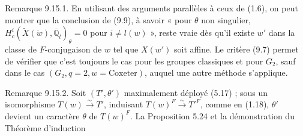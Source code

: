 \documentclass[9pt,twoside]{extarticle}
\begin{document}
{Remarque 9.15.1. En utilisant des arguments parallèles à ceux de (1.6), on peut montrer que la conclusion de (9.9), à savoir « pour \(\theta\) non singulier, \(H_c^i(\widetilde X(\dot w),\overline{\mathbb Q}_l)_\theta=0\) pour \(i\ne l(w)\) », reste vraie dès qu'il existe \(w'\) dans la classe de \(F\)-conjugaison de \(w\) tel que \(X(w')\) soit affine. Le critère (9.7) permet de vérifier que c'est toujours le cas pour les groupes classiques et pour \(G_2\), sauf dans le cas \((G_2,q=2,w=\text{Coxeter})\), auquel une autre méthode s'applique.\par

Remarque 9.15.2. Soit \((T',\theta')\) maximalement déployé (5.17) ; sous un isomorphisme \(T(w)\xrightarrow{\sim}T'\), induisant \(T(w)^F\xrightarrow{\sim}T'^F\), comme en (1.18), \(\theta'\) devient un caractère \(\theta\) de \(T(w)^F\). La Proposition 5.24 et la démonstration du Théorème d'induction\par
}
\end{document}
